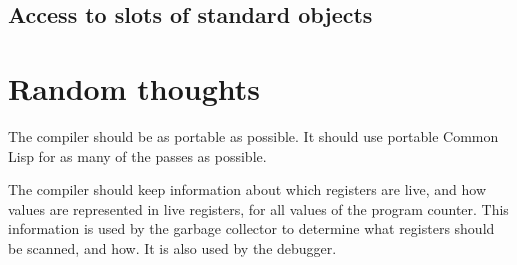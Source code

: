 \subsection{Access to slots of standard objects}

\section{Random thoughts}

The compiler should be as portable as possible.  It should use
portable Common Lisp for as many of the passes as possible.  

The compiler should keep information about which registers are live,
and how values are represented in live registers, for all values of
the program counter.  This information is used by the garbage
collector to determine what registers should be scanned, and how.   It
is also used by the debugger.  

